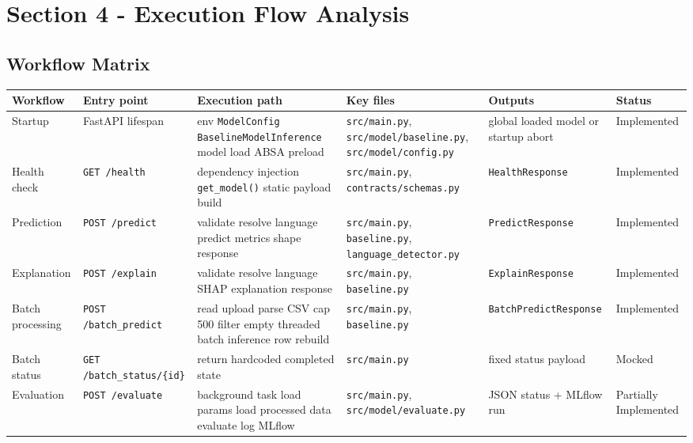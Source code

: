\section{Section 4 - Execution Flow Analysis}
\subsection{Workflow Matrix}
\begin{longtable}{@{}p{}p{}p{}p{}p{}p{}@{}}
\toprule
\textbf{Workflow} & \textbf{Entry point} & \textbf{Execution path} & \textbf{Key files} & \textbf{Outputs} & \textbf{Status} \\
\midrule
\endhead
Startup & FastAPI lifespan & env \textrightarrow{} \texttt{ModelConfig} \textrightarrow{} \texttt{BaselineModelInference} \textrightarrow{} model load \textrightarrow{} ABSA preload & \texttt{src/main.py}, \texttt{src/model/baseline.py}, \texttt{src/model/config.py} & global loaded model or startup abort & Implemented \\
Health check & \texttt{GET /health} & dependency injection \textrightarrow{} \texttt{get\_model()} \textrightarrow{} static payload build & \texttt{src/main.py}, \texttt{contracts/schemas.py} & \texttt{HealthResponse} & Implemented \\
Prediction & \texttt{POST /predict} & validate \textrightarrow{} resolve language \textrightarrow{} predict \textrightarrow{} metrics \textrightarrow{} shape response & \texttt{src/main.py}, \texttt{baseline.py}, \texttt{language\_detector.py} & \texttt{PredictResponse} & Implemented \\
Explanation & \texttt{POST /explain} & validate \textrightarrow{} resolve language \textrightarrow{} SHAP explanation \textrightarrow{} response & \texttt{src/main.py}, \texttt{baseline.py} & \texttt{ExplainResponse} & Implemented \\
Batch processing & \texttt{POST /batch\_predict} & read upload \textrightarrow{} parse CSV \textrightarrow{} cap 500 \textrightarrow{} filter empty \textrightarrow{} threaded batch inference \textrightarrow{} row rebuild & \texttt{src/main.py}, \texttt{baseline.py} & \texttt{BatchPredictResponse} & Implemented \\
Batch status & \texttt{GET /batch\_status/\{id\}} & return hardcoded completed state & \texttt{src/main.py} & fixed status payload & Mocked \\
Evaluation & \texttt{POST /evaluate} & background task \textrightarrow{} load params \textrightarrow{} load processed data \textrightarrow{} evaluate \textrightarrow{} log MLflow & \texttt{src/main.py}, \texttt{src/model/evaluate.py} & JSON status + MLflow run & Partially Implemented \\

\end{longtable}
